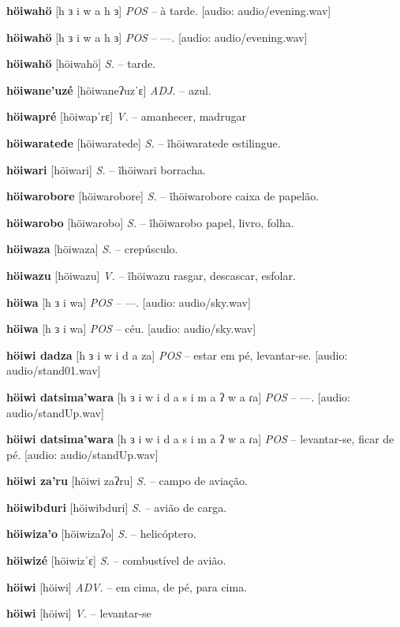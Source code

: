 \textbf{höiwahö} [h ɜ i w a h ɜ] \textit{POS} -- à tarde. [audio: audio/evening.wav]{\faHeadphones}

\textbf{höiwahö} [h ɜ i w a h ɜ] \textit{POS} -- —. [audio: audio/evening.wav]{\faHeadphones}

\textbf{höiwahö} [höiwahö] \textit{S.} -- tarde.

\textbf{höiwane'uzé} [höiwaneʔuzˈɛ] \textit{ADJ.} -- azul.

\textbf{höiwapré} [höiwapˈrɛ] \textit{V.} -- amanhecer, madrugar

\textbf{höiwaratede} [höiwaratede] \textit{S.} -- ĩhöiwaratede estilingue.

\textbf{höiwari} [höiwari] \textit{S.} -- ĩhöiwari borracha.

\textbf{höiwarobore} [höiwarobore] \textit{S.} -- ĩhöiwarobore caixa de papelão.

\textbf{höiwarobo} [höiwarobo] \textit{S.} -- ĩhöiwarobo papel, livro, folha.

\textbf{höiwaza} [höiwaza] \textit{S.} -- crepúsculo.

\textbf{höiwazu} [höiwazu] \textit{V.} -- ĩhöiwazu rasgar, descascar, esfolar.

\textbf{höiwa} [h ɜ i wa] \textit{POS} -- —. [audio: audio/sky.wav]{\faHeadphones}

\textbf{höiwa} [h ɜ i wa] \textit{POS} -- céu. [audio: audio/sky.wav]{\faHeadphones}

\textbf{höiwi dadza} [h ɜ i w i d a za] \textit{POS} -- estar em pé, levantar-se. [audio: audio/stand01.wav]{\faHeadphones}

\textbf{höiwi datsima'wara} [h ɜ i w i d a s i m a ʔ w a ɾa] \textit{POS} -- —. [audio: audio/standUp.wav]{\faHeadphones}

\textbf{höiwi datsima'wara} [h ɜ i w i d a s i m a ʔ w a ɾa] \textit{POS} -- levantar-se, ficar de pé. [audio: audio/standUp.wav]{\faHeadphones}

\textbf{höiwi za'ru} [höiwi zaʔru] \textit{S.} -- campo de aviação.

\textbf{höiwibduri} [höiwibduri] \textit{S.} -- avião de carga.

\textbf{höiwiza'o} [höiwizaʔo] \textit{S.} -- helicóptero.

\textbf{höiwizé} [höiwizˈɛ] \textit{S.} -- combustível de avião.

\textbf{höiwi} [höiwi] \textit{ADV.} -- em cima, de pé, para cima.

\textbf{höiwi} [höiwi] \textit{V.} -- levantar-se

